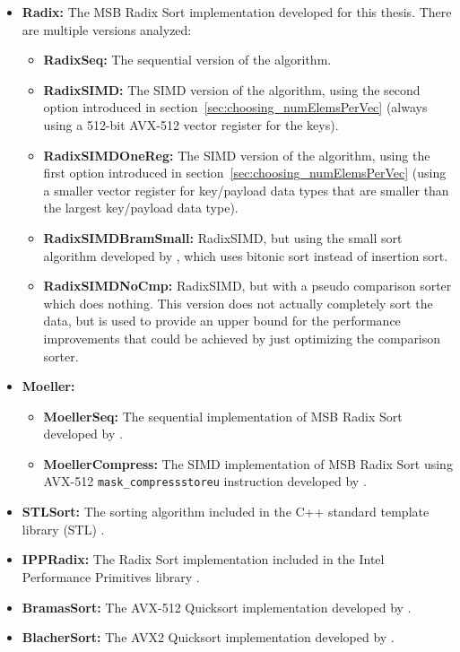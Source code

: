\documentclass[12pt, a4paper, openright, twoside]{tiarbeit}
\begin{document}
\begin{itemize}
  \item \textbf{Radix:} The MSB Radix Sort implementation developed for this thesis.
        There are multiple versions analyzed:
        \begin{itemize}
          \item \textbf{RadixSeq:} The sequential version of the algorithm.
          \item \textbf{RadixSIMD:} The SIMD version of the algorithm, using the
                second option introduced in section~\ref{sec:choosing_numElemsPerVec}
                (always using a 512-bit AVX-512 vector register for the keys).
          \item \textbf{RadixSIMDOneReg:} The SIMD version of the algorithm, using the
                first option introduced in section~\ref{sec:choosing_numElemsPerVec}
                (using a smaller vector register for key/payload data types that are
                smaller than the largest key/payload data type).
          \item \textbf{RadixSIMDBramSmall:} RadixSIMD, but using
                the small sort algorithm developed by \cite{bramas},
                which uses bitonic sort instead of insertion sort.
          \item \textbf{RadixSIMDNoCmp:} RadixSIMD, but
                with a pseudo comparison sorter which does nothing.
                This version does not actually completely sort the data,
                but is used to provide an upper bound for the performance improvements
                that could be achieved by just optimizing the comparison sorter.
        \end{itemize}
  \item \textbf{Moeller:}
        \begin{itemize}
          \item \textbf{MoellerSeq:} The sequential implementation of MSB Radix Sort
                developed by \cite{moeller_radix}.
          \item \textbf{MoellerCompress:} The SIMD implementation of MSB Radix Sort
                using AVX-512 \texttt{mask\_compressstoreu} instruction developed by \cite{moeller_radix}.
        \end{itemize}
  \item \textbf{STLSort:} The sorting algorithm included in the C++ standard
        template library (STL) \citep{enwiki:stl_sort}.
  \item \textbf{IPPRadix:} The Radix Sort implementation included in the Intel
        Performance Primitives library \citep{intel_ipp}.
  \item \textbf{BramasSort:} The AVX-512 Quicksort implementation developed by \cite{bramas}.
  \item \textbf{BlacherSort:} The AVX2 Quicksort implementation developed by \cite{blacher}.
\end{itemize}
\end{document}
